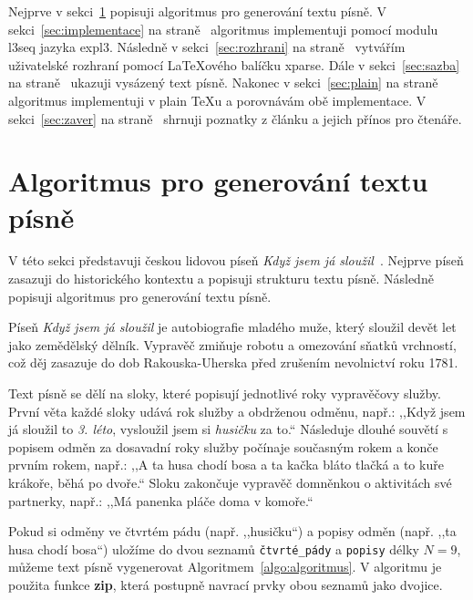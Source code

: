 \documentclass{csbulletin}
\newcommand\vref[1]{\ref{#1} na straně~\pageref{#1}}
\newcommand\pkg{\textsf}
\begin{document}
Nejprve v sekci~\ref{sec:algoritmus} popisuji algoritmus pro generování textu písně. V sekci~\vref{sec:implementace} algoritmus implementuji pomocí modulu \pkg{l3seq} jazyka expl3. Následně v sekci~\vref{sec:rozhrani} vytvářím uživatelské rozhraní pomocí \LaTeX ového balíčku \pkg{xparse}. Dále v sekci~\vref{sec:sazba} ukazuji vysázený text písně. Nakonec v sekci~\vref{sec:plain} algoritmus implementuji v plain \TeX u a porovnávám obě implementace. V sekci~\vref{sec:zaver} shrnuji poznatky z článku a jejich přínos pro čtenáře.

\section{Algoritmus pro generování textu písně}
\label{sec:algoritmus}

V této sekci představuji českou lidovou píseň \emph{Když jsem já sloužil}~\cite{hroudova2015kdyz}.
Nejprve píseň zasazuji do historického kontextu a popisuji strukturu textu písně.
Následně popisuji algoritmus pro generování textu písně.

Píseň \emph{Když jsem já sloužil} je autobiografie mladého muže, který sloužil devět let jako zemědělský dělník. Vypravěč zmiňuje robotu a omezování sňatků vrchností, což děj zasazuje do dob Rakouska-Uherska před zrušením nevolnictví roku 1781.

Text písně se dělí na sloky, které popisují jednotlivé roky vypravěčovy služby. První věta každé sloky udává rok služby a obdrženou odměnu, např.: ,,Když jsem já sloužil to \emph{3. léto}, vysloužil jsem si \emph{husičku} za to.`` Následuje dlouhé souvětí s popisem odměn za dosavadní roky služby počínaje současným rokem a konče prvním rokem, např.: ,,A ta husa chodí bosa a ta kačka bláto tlačká a to kuře krákoře, běhá po dvoře.`` Sloku zakončuje vypravěč domněnkou o aktivitách své partnerky, např.: ,,Má panenka pláče doma v komoře.``

Pokud si odměny ve čtvrtém pádu (např. ,,husičku``) a popisy odměn (např. ,,ta husa chodí bosa``) uložíme do dvou seznamů \texttt{čtvrté\_pády} a \texttt{popisy} délky $N=9$, můžeme text písně vygenerovat Algoritmem~\ref{algo:algoritmus}. V algoritmu je použita funkce \textbf{zip}, která postupně navrací prvky obou seznamů jako dvojice.
\end{document}
